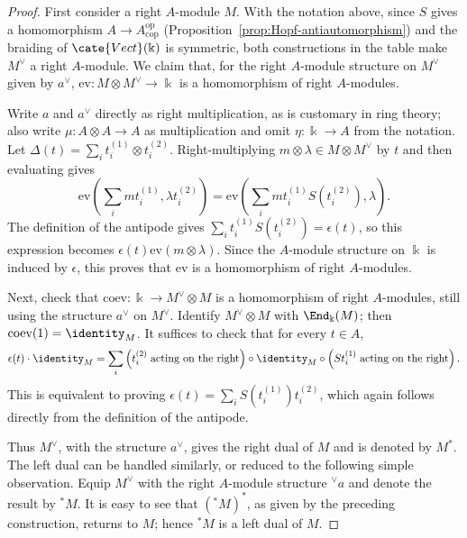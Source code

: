 \begin{proof}
	First consider a right $A$-module $M$. With the notation above, since $S$
	gives a homomorphism $A\to A^{\mathrm{op}}_{\mathrm{cop}}$
	(Proposition~\ref{prop:Hopf-antiautomorphism}) and the braiding of
	$\cate{Vect}(\Bbbk)$ is symmetric, both constructions in the table make
	$M^\vee$ a right $A$-module. We claim that, for the right $A$-module
	structure on $M^\vee$ given by $a^\vee$,
	$\mathrm{ev}:M\otimes M^\vee\to\Bbbk$ is a homomorphism of right
	$A$-modules.

	Write $a$ and $a^\vee$ directly as right multiplication, as is customary
	in ring theory; also write $\mu:A\otimes A\to A$ as multiplication and
	omit $\eta:\Bbbk\to A$ from the notation. Let
	$\Delta(t)=\sum_i t_i^{(1)}\otimes t_i^{(2)}$. Right-multiplying
	$m\otimes\lambda\in M\otimes M^\vee$ by $t$ and then evaluating gives
	\[ \mathrm{ev}\left( \sum_i m t_i^{(1)}, \lambda t_i^{(2)} \right) = \mathrm{ev}\left( \sum_i m t_i^{(1)} S\left(t_i^{(2)}\right), \lambda \right). \]
	The definition of the antipode gives
	$\sum_i t_i^{(1)}S(t_i^{(2)})=\epsilon(t)$, so this expression becomes
	$\epsilon(t)\mathrm{ev}(m\otimes\lambda)$. Since the $A$-module structure
	on $\Bbbk$ is induced by $\epsilon$, this proves that $\mathrm{ev}$ is a
	homomorphism of right $A$-modules.

	Next, check that $\mathrm{coev}:\Bbbk\to M^\vee\otimes M$ is a
	homomorphism of right $A$-modules, still using the structure $a^\vee$ on
	$M^\vee$. Identify $M^\vee\otimes M$ with $\End_{\Bbbk}(M)$; then
	$\mathrm{coev}(1)=\identity_M$. It suffices to check that for every
	$t\in A$,
	\[ \epsilon(t) \cdot \identity_M = \sum_i \left( t_i^{(2)} \;\text{acting on the right} \right) \circ \identity_M \circ \left( S t_i^{(1)} \;\text{acting on the right} \right). \]
	This is equivalent to proving
	$\epsilon(t)=\sum_iS(t_i^{(1)})t_i^{(2)}$, which again follows directly
	from the definition of the antipode.

	Thus $M^\vee$, with the structure $a^\vee$, gives the right dual of $M$
	and is denoted by $M^*$. The left dual can be handled similarly, or reduced
	to the following simple observation. Equip $M^\vee$ with the right
	$A$-module structure ${}^\vee a$ and denote the result by ${}^*M$. It is
	easy to see that $({}^*M)^*$, as given by the preceding construction,
	returns to $M$; hence ${}^*M$ is a left dual of $M$.


\end{proof}
